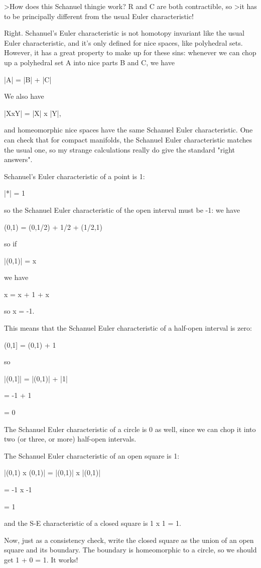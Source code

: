>How does this Schanuel thingie work? R and C are both contractible, so
>it has to be principally different from the usual Euler characteristic!

Right.  Schanuel's Euler characteristic is not homotopy invariant like 
the usual Euler characteristic, and it's only defined for nice spaces,
like polyhedral sets.   However, it has a great property to make up 
for these sins: whenever we can chop up a polyhedral set A into nice parts 
B and C, we have

|A| = |B| + |C|

We also have

|XxY| = |X| x |Y|, 

and homeomorphic nice spaces have the same Schanuel Euler characteristic.
One can check that for compact manifolds, the Schanuel Euler characteristic
matches the usual one, so my strange calculations really do give the
standard "right answers".

Schanuel's Euler characteristic of a point is 1:

|*| = 1

so the Schanuel Euler characteristic of the open interval
must be -1: we have

(0,1) = (0,1/2) + {1/2} + (1/2,1)

so if 

|(0,1)| = x

we have

x = x + 1 + x

so x = -1.

This means that the Schanuel Euler characteristic of a half-open
interval is zero:

(0,1] = (0,1) + {1}

so 

|(0,1]| = |(0,1)| + |{1}|

        =    -1   +   1

        =     0
           
The Schanuel Euler characteristic of a circle is 0 as well,
since we can chop it into two (or three, or more) half-open intervals.

The Schanuel Euler characteristic of an open square is 1:

|(0,1) x (0,1)| = |(0,1)| x |(0,1)| 

                =   -1    x    -1

                =    1

and the S-E characteristic of a closed square is 1 x 1 = 1.

Now, just as a consistency check, write the closed square as 
the union of an open square and its boundary.  The boundary
is homeomorphic to a circle, so we should get 1 + 0 = 1.  It works!

